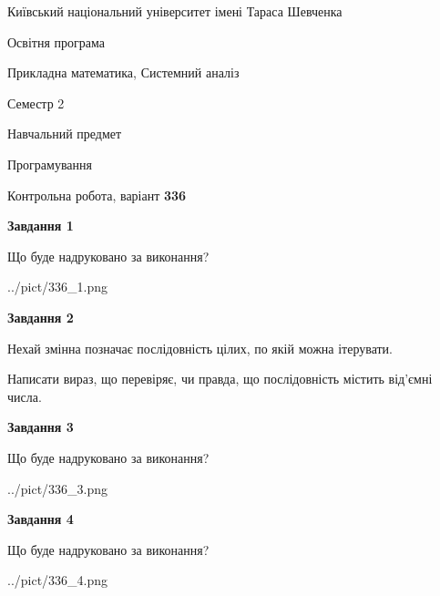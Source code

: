 \documentclass[12pt, ukrainian]{article}
\begin{document}
{{\begin {small}\par
{ \center  Київський національний університет імені Тараса Шевченка \par}
{\parbox {5 cm}{Освітня програма \hfill}{\parbox {8 cm}{Прикладна математика, Системний аналіз \hfill}}\parbox {5 cm}{\hfill Семестр 2}}\par
{\parbox {5 cm} {Навчальний предмет \hfill}\parbox {7 cm}{Програмування \hfill}\parbox {6cm}{\hfill}\par}\vspace{-7pt} \end{small}}{\center Контрольна робота, варіант  \No \textbf
{ 336 }\par}}
{
\begin {large}
{\begin {center}\textbf{Завдання 1}\end {center}}\par
Що буде надруковано за виконання?\par\par
\begin{center}
	{../pict/336_1.png}
\end{center}
\newpage

{\begin {center}\textbf{Завдання 2}\end {center}}\par
Нехай змінна  позначає послідовність цілих, по якій можна ітерувати.

Написати вираз, що перевіряє, чи правда, що послідовність  містить від’ємні числа.\par
\newpage

{\begin {center}\textbf{Завдання 3}\end {center}}\par
Що буде надруковано за виконання?
\begin{center}
	{../pict/336_3.png}
\end{center}
\newpage

{\begin {center}\textbf{Завдання 4}\end {center}}\par
Що буде надруковано за виконання?\par
\begin{center}
	{../pict/336_4.png}
\end{center}
\newpage


\end{large}}
\end{document}
